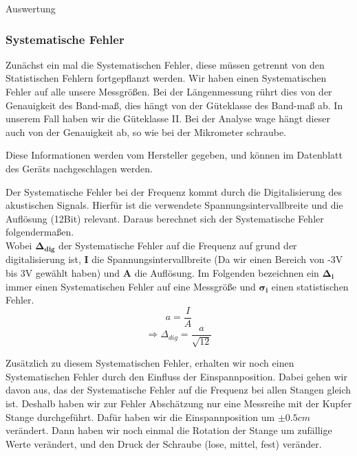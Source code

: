 \documentclass[twoside]{protokoll}
\begin{document}
\begin{aufgabe}{Auswertung}
\subsubsection{Systematische Fehler}
Zunächst ein mal die Systematischen Fehler, diese müssen getrennt von den Statistischen Fehlern fortgepflanzt werden.
Wir haben einen Systematischen Fehler auf alle unsere Messgrößen.
Bei der Längenmessung rührt dies von der Genauigkeit des Band-maß, dies hängt von der Güteklasse des Band-maß ab.
In unserem Fall haben wir die Güteklasse II.
Bei der Analyse wage  hängt dieser auch von der Genauigkeit ab, so wie bei der Mikrometer schraube. 
 
Diese Informationen werden vom Hersteller gegeben, und können im Datenblatt des Geräts nachgeschlagen werden. 

Der Systematische Fehler bei der Frequenz kommt durch die Digitalisierung des akustischen Signals. Hierfür ist die verwendete Spannungsintervallbreite und die Auflösung (12Bit) relevant. Daraus berechnet sich der Systematische Fehler folgendermaßen.\\
 Wobei $ \pmb{\Delta_{dig}} $ der Systematische Fehler auf die Frequenz auf grund der digitalisierung ist, \textbf{I} die Spannungsintervallbreite (Da wir einen Bereich von -3V bis 3V gewählt haben) und \textbf{A} die Auflösung. Im Folgenden bezeichnen ein $\pmb{\Delta_i}$ immer einen Systematischen Fehler auf eine Messgröße und $ \pmb{\sigma_i}$ einen statistischen Fehler.\\ 
\begin{equation}
         a = \frac{I}{A}
    \end{equation}
\begin{equation}
         \Rightarrow 
         \Delta_{dig} = \frac{a}{\sqrt{12}}
\end{equation}

Zusätzlich zu diesem Systematischen Fehler, erhalten wir noch einen Systematischen Fehler durch den Einfluss der Einspannposition.
Dabei gehen wir davon aus, das der Systematische Fehler auf die Frequenz bei allen Stangen gleich ist.
Deshalb haben wir zur Fehler Abschätzung nur eine Messreihe mit der Kupfer Stange durchgeführt.
Dafür haben wir die Einspannposition um $\pm{0.5}{cm}$ verändert.
Dann haben wir noch einmal die Rotation der Stange um zufällige Werte verändert, und den Druck der Schraube (lose, mittel, fest) veränder.
 


\end{aufgabe}
\end{document}
